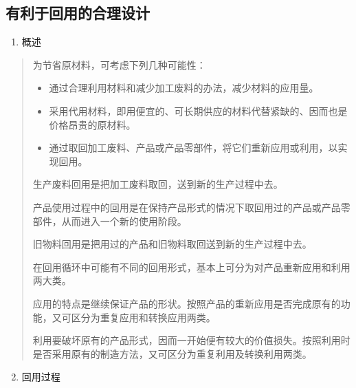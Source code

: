 \documentclass[letterpaper,10pt,english]{sphinxmanual}
\begin{document}
\subsection{有利于回用的合理设计}
\label{unit6:id23}\begin{enumerate}
\item {} 
概述

\end{enumerate}
\begin{quote}

为节省原材料，可考虑下列几种可能性：
\begin{itemize}
\item {} 
通过合理利用材料和减少加工废料的办法，减少材料的应用量。

\item {} 
采用代用材料，即用便宜的、可长期供应的材料代替紧缺的、因而也是价格昂贵的原材料。

\item {} 
通过取回加工废料、产品或产品零部件，将它们重新应用或利用，以实现回用。

\end{itemize}

生产废料回用是把加工废料取回，送到新的生产过程中去。

产品使用过程中的回用是在保持产品形式的情况下取回用过的产品或产品零部件，从而进入一个新的使用阶段。

旧物料回用是把用过的产品和旧物料取回送到新的生产过程中去。

在回用循环中可能有不同的回用形式，基本上可分为对产品重新应用和利用两大类。

应用的特点是继续保证产品的形状。按照产品的重新应用是否完成原有的功能，又可区分为重复应用和转换应用两类。

利用要破坏原有的产品形式，因而一开始便有较大的价值损失。按照利用时是否采用原有的制造方法，又可区分为重复利用及转换利用两类。
\end{quote}
\begin{enumerate}
\setcounter{enumi}{1}
\item {} 
回用过程

\end{enumerate}
\end{document}
